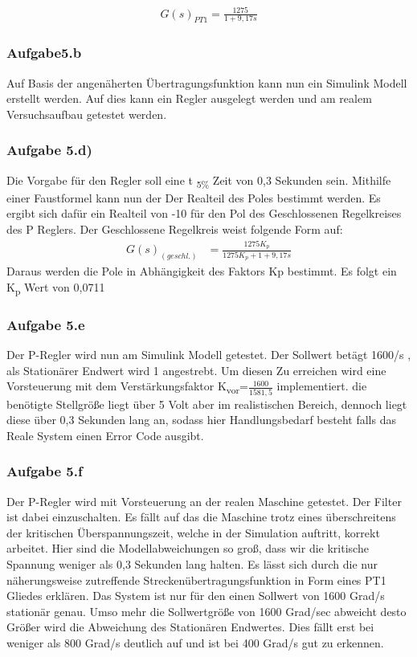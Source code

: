 \documentclass[10pt]{scrartcl}
\begin{document}
\begin{align}
   G(s)_{PT1}=\frac{1275}{1+9,17s}
\end{align}
\subsubsection{Aufgabe5.b}
Auf Basis der angenäherten Übertragungsfunktion kann nun ein Simulink Modell erstellt werden. Auf dies kann ein Regler ausgelegt werden und am realem Versuchsaufbau getestet werden.
\subsubsection{Aufgabe 5.d)}	
Die Vorgabe für den Regler soll eine t \textsubscript{5\%} Zeit von 0,3 Sekunden sein. Mithilfe einer Faustformel kann nun der Der Realteil des Poles bestimmt werden. Es ergibt sich dafür ein Realteil von -10 für den Pol des Geschlossenen Regelkreises des P Reglers. Der Geschlossene Regelkreis weist folgende Form auf:
\begin{align}
G(s)_{(geschl.)}&=\frac{1275K_p}{1275K_p+ 1+9,17s}
\end{align}
Daraus werden die Pole in Abhängigkeit des Faktors Kp bestimmt. Es folgt ein K\textsubscript{p} Wert von 0,0711 \\
\subsubsection{Aufgabe 5.e}	
Der P-Regler wird nun am Simulink Modell getestet. Der Sollwert betägt 1600\textdegree/s , als Stationärer Endwert wird 1 angestrebt. Um diesen Zu erreichen wird eine Vorsteuerung mit dem Verstärkungsfaktor  K\textsubscript{vor}=$\frac{1600}{1581,5}$ implementiert.
 die benötigte Stellgröße liegt über 5 Volt aber im realistischen Bereich, dennoch liegt diese über 0,3 Sekunden lang an, sodass hier Handlungsbedarf besteht falls das Reale System einen Error Code ausgibt.\\
\subsubsection{Aufgabe 5.f}	
Der P-Regler wird mit Vorsteuerung an der realen Maschine getestet. Der Filter ist dabei einzuschalten. Es fällt auf das die Maschine trotz eines überschreitens der kritischen Überspannungszeit, welche in der Simulation auftritt, korrekt arbeitet. Hier sind die Modellabweichungen so groß, dass wir die kritische Spannung weniger als 0,3 Sekunden  lang halten. Es lässt sich durch die nur näherungsweise zutreffende Streckenübertragungsfunktion in Form eines PT1 Gliedes erklären. Das System ist nur für den einen Sollwert von 1600 Grad/s stationär genau. Umso mehr die Sollwertgröße von 1600 Grad/sec abweicht desto Größer wird die Abweichung des Stationären Endwertes. Dies fällt erst bei weniger als 800 Grad/s deutlich auf und ist bei 400 Grad/s gut zu erkennen.\\
\end{document}
